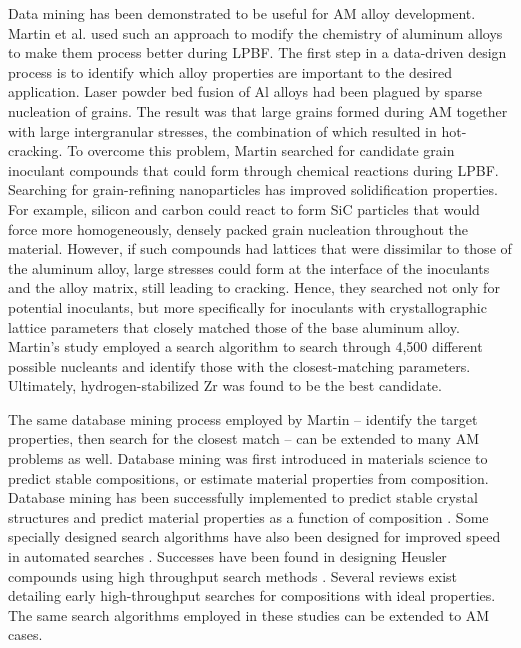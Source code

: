 Data mining has been demonstrated to be useful for AM alloy development. Martin et al. used such an approach to modify the chemistry of aluminum alloys to make them process better during LPBF\cite{Martin2017}. The first step in a data-driven design process is to identify which alloy properties are important to the desired application. Laser powder bed fusion of Al alloys had been plagued by sparse nucleation of grains. The result was that large grains formed during AM together with large intergranular stresses, the combination of which resulted in hot-cracking. To overcome this problem, Martin searched for candidate grain inoculant compounds that could form through chemical reactions during LPBF. Searching for grain-refining nanoparticles has improved solidification properties\cite{Neuchterlein2016}. For example, silicon and carbon could react to form SiC particles that would force more homogeneously, densely packed grain nucleation throughout the material. However, if such compounds had lattices that were dissimilar to those of the aluminum alloy, large stresses could form at the interface of the inoculants and the alloy matrix, still leading to cracking. Hence, they searched not only for potential inoculants, but more specifically for inoculants with crystallographic lattice parameters that closely matched those of the base aluminum alloy. Martin's study employed a search algorithm to search through 4,500 different possible nucleants and identify those with the closest-matching parameters. Ultimately, hydrogen-stabilized Zr was found to be the best candidate.

The same database mining process employed by Martin -- identify the target properties, then search for the closest match -- can be extended to many AM problems as well. Database mining was first introduced in materials science to predict stable compositions, or estimate material properties from composition. Database mining has been successfully implemented to predict stable crystal structures \cite{Franceschetti1999, Fischer2006, Oganov2006} and predict material properties as a function of composition \cite{Ikeda1997, Gopakumar2018, Wu2018, Kirklin2013, Setyawan2011}. Some specially designed search algorithms have also been designed for improved speed in automated searches \cite{Wolf2000}. Successes have been found in designing Heusler compounds using high throughput search methods \cite{Roy2012}. Several reviews exist detailing early high-throughput searches for compositions with ideal properties\cite{Gilmer1998, Koinuma2004}. The same search algorithms employed in these studies can be extended to AM cases.

